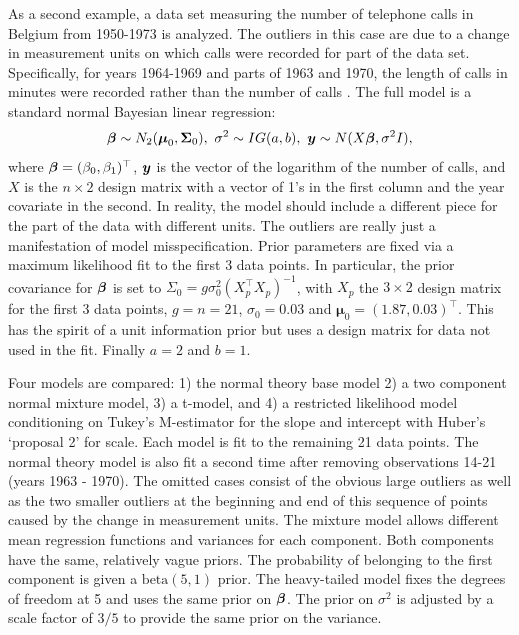 \documentclass[ba]{imsart}
\def\bbeta{\mbox{\boldmath $\beta$}}
\newcommand{\by}{\mbox{\boldmath $y$}}
\begin{document}

As a second example, a data set measuring the number of telephone calls in Belgium from 1950-1973 is analyzed. The outliers in this case are due to a change in measurement units on which calls were recorded for part of the data set. Specifically, for years 1964-1969 and parts of 1963 and 1970, the length of calls in minutes were recorded rather than the number of calls \citep{rousseeuw1987}. The full model is a standard normal Bayesian linear regression:
\begin{equation}
{\boldsymbol{\beta}}\sim N_{2}(\boldsymbol{\mu}_{0}, \boldsymbol{\Sigma}_{0}),\  \sigma^{2} \sim IG(a, b),\  \by \sim N(X\boldsymbol{\beta}, \sigma^{2} I),
\end{equation}
where $\bbeta = (\beta_{0}, \beta_{1})^{\top}$, $\by$ is the vector of the logarithm of the number of calls, and $X$ is the $n\times 2$ design matrix with a vector of 1's in the first column and the year covariate in the second. In reality, the model should include a different piece for the part of the data with different units. The outliers are really just a manifestation of model misspecification. Prior parameters are fixed via a maximum likelihood fit to the first 3 data points. In particular, the prior covariance for $\bbeta$ is set to $\Sigma_{0} = g\sigma_{0}^2 (X_{p}^{\top}X_{p})^{-1}$, with $X_{p}$ the $3\times 2$ design matrix for the first $3$ data points, $g=n=21$, $\sigma_{0} = 0.03$ and $\boldsymbol{\mu}_{0} = (1.87,  0.03)^{\top}$.  This has the spirit of a unit information prior \citep{kass1995reference} but uses a design matrix for data not used in the fit. Finally $a = 2$ and $b =1$.

Four models are compared: 1) the normal theory base model 2) a two component normal mixture model, 3) a t-model, and 4) a restricted likelihood model conditioning on Tukey's M-estimator for the slope and intercept with Huber's `proposal 2'  for scale. Each model is fit to the remaining 21 data points. The normal theory model is also fit a second time after removing observations 14-21 (years 1963 - 1970). The omitted cases consist of the obvious large outliers as well as the two smaller outliers at the beginning and end of this sequence of points caused by the change in measurement units. The mixture model allows different mean regression functions and variances for each component.  Both components have the same, relatively vague priors. The probability of belonging to the first component is given a $\text{beta}(5,1)$ prior. The heavy-tailed model fixes the degrees of freedom at 5 and uses the same prior on $\bbeta$.  The prior on $\sigma^2$ is adjusted by a scale factor of $3/5$ to provide the same prior on the variance.  
\end{document}
